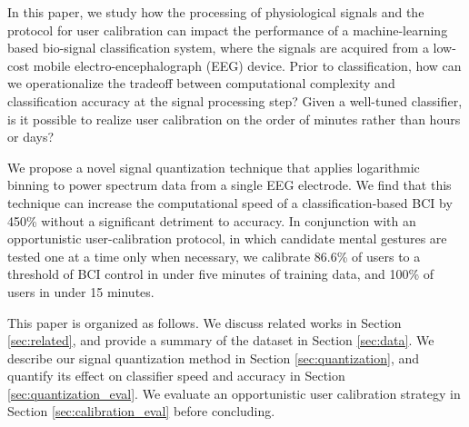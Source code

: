 
In this paper, we study how the processing of physiological signals and the protocol for user calibration can impact the performance of a machine-learning based bio-signal classification system, where the signals are acquired from a low-cost mobile electro-encephalograph (EEG) device. Prior to classification, how can we operationalize the tradeoff between computational complexity and classification accuracy at the signal processing step? Given a well-tuned classifier, is it possible to realize user calibration on the order of minutes rather than hours or days?


We propose a novel signal quantization technique that applies logarithmic binning to power spectrum data from a single EEG electrode. We find that this technique can increase the computational speed of a classification-based BCI by 450\% without a significant detriment to accuracy. In conjunction with an opportunistic user-calibration protocol, in which candidate mental gestures are tested one at a time only when necessary, we calibrate 86.6\% of users to a threshold of BCI control in under five minutes of training data, and 100\% of users in under 15 minutes. 

This paper is organized as follows. We discuss related works in Section \ref{sec:related}, and provide a summary of the dataset in Section \ref{sec:data}. We describe our signal quantization method in Section \ref{sec:quantization}, and quantify its effect on classifier speed and accuracy in Section \ref{sec:quantization_eval}. We evaluate an opportunistic user calibration strategy in Section \ref{sec:calibration_eval} before concluding.
